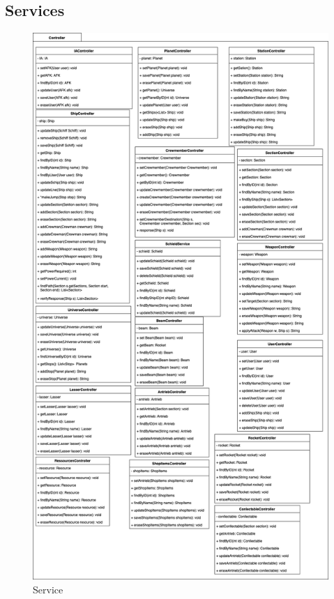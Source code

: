 \documentclass[fontsize=12pt,paper=a4,twoside]{scrartcl}
\begin{document}
\subsection{Services}
\begin{figure}[htp]
	\centering
	\includegraphics[width=0.6\linewidth]{pics/ServicesModel.png}
	\caption{Service}
	\label{fig2}
	
\end{figure}
\newpage
\end{document}
